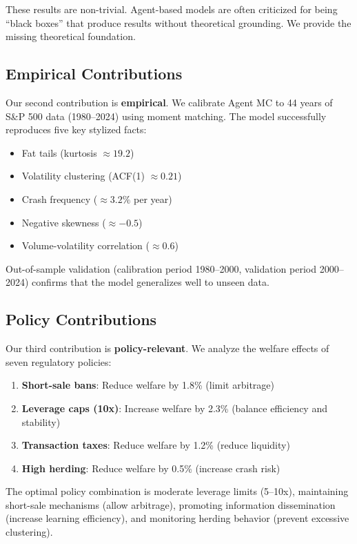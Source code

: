 These results are non-trivial. Agent-based models are often criticized for being ``black boxes'' that produce results without theoretical grounding. We provide the missing theoretical foundation.

\subsection{Empirical Contributions}

Our second contribution is \textbf{empirical}. We calibrate Agent MC to 44 years of S\&P 500 data (1980--2024) using moment matching. The model successfully reproduces five key stylized facts:

\begin{itemize}
    \item Fat tails (kurtosis $\approx 19.2$)
    \item Volatility clustering (ACF(1) $\approx 0.21$)
    \item Crash frequency ($\approx 3.2\%$ per year)
    \item Negative skewness ($\approx -0.5$)
    \item Volume-volatility correlation ($\approx 0.6$)
\end{itemize}

Out-of-sample validation (calibration period 1980--2000, validation period 2000--2024) confirms that the model generalizes well to unseen data.

\subsection{Policy Contributions}

Our third contribution is \textbf{policy-relevant}. We analyze the welfare effects of seven regulatory policies:

\begin{enumerate}
    \item \textbf{Short-sale bans}: Reduce welfare by 1.8\% (limit arbitrage)
    \item \textbf{Leverage caps (10x)}: Increase welfare by 2.3\% (balance efficiency and stability)
    \item \textbf{Transaction taxes}: Reduce welfare by 1.2\% (reduce liquidity)
    \item \textbf{High herding}: Reduce welfare by 0.5\% (increase crash risk)
\end{enumerate}

The optimal policy combination is moderate leverage limits (5--10x), maintaining short-sale mechanisms (allow arbitrage), promoting information dissemination (increase learning efficiency), and monitoring herding behavior (prevent excessive clustering).

